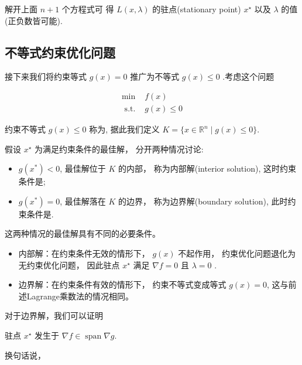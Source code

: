 解开上面 $ n+1 $ 个方程式可 得 $ L({x}, \lambda) $ 的驻点(stationary point) $ {x}^{\star} $ 以及 $ \lambda $ 的值(正负数皆可能).

\subsection{不等式约束优化问题}

接下来我们将约束等式 $ g({x})=0 $ 推广为不等式 $ g({x}) \leq 0 $ .考虑这个问题

\begin{problem}[不等式约束优化问题]

\begin{equation}
\begin{array}{ll}
\min & f({x}) \\
\text { s.t. } & g({x}) \leq 0
\end{array}
\end{equation}

约束不等式 $ g({x}) \leq 0 $ 称为, 据此我们定义 $ K=\{ {x} \in \mathbb{R}^{n} \mid g({x}) \leq 0 \}$.
\end{problem}

假设 $ {x}^{\star} $ 为满足约束条件的最佳解， 分开两种情况讨论:

\begin{itemize}
    \item $ g\left({x}^{*}\right)<0 $, 最佳解位于 $ K $ 的内部， 称为内部解(interior solution), 这时约束条件是;
    \item $ g\left({x}^{*}\right)=0 $, 最佳解落在 $ K $ 的边界， 称为边界解(boundary solution), 此时约束条件是.
\end{itemize}

这两种情况的最佳解具有不同的必要条件。

\begin{itemize}
    \item 内部解：在约束条件无效的情形下， $ g({x}) $ 不起作用， 约束优化问题退化为无约束优化问题， 因此驻点 $ {x}^{\star} $ 满足 $ \nabla f={0} $ 且 $ \lambda=0 $ .
    \item 边界解：在约束条件有效的情形下， 约束不等式变成等式 $g({x})=0$, 这与前述Lagrange乘数法的情况相同。
\end{itemize}

对于边界解，我们可以证明

\begin{theorem}
    驻点 ${x}^{\star}$ 发生于 $\nabla f \in \operatorname{span} \nabla g$.
\end{theorem}
换句话说， 

